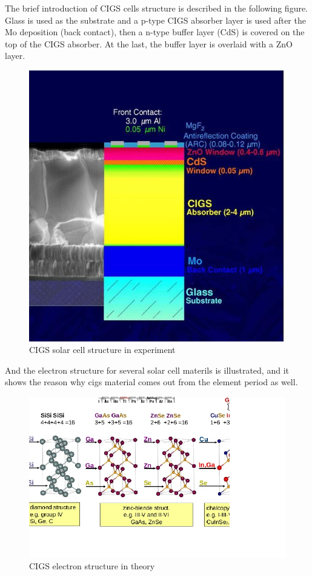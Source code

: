 \documentclass[a4paper, 12pt, titlepage,oneside,drop]{kthesis}
\begin{document}
The brief introduction of CIGS cells structure is described in the following figure. Glass is used as the substrate and a p-type CIGS absorber layer is used after 
the Mo deposition (back contact), then a n-type buffer layer (CdS) is covered on the top of the CIGS absorber.
At the last, the buffer layer is overlaid with a ZnO layer.

\begin{figure}[H]\label{cigs_cells}
\centering
\includegraphics[scale=.5]{CIGS_Structure.JPG}
\caption{CIGS solar cell structure in experiment}
\end{figure}



And the electron structure for several solar cell materils is illustrated, and it shows the reason why cigs material comes out from the element period as well.

\begin{figure}[H]\label{cigs_bonds}
\centering
\includegraphics[scale=.5]{untitled.png}
\caption{CIGS electron structure in theory}
\end{figure}
\end{document}
